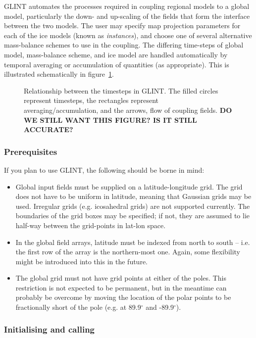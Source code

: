 GLINT automates the processes required in coupling regional models to a global
model, particularly the down- and up-scaling of the fields that form the
interface between the two models. The user may specify map projection
parameters for each of the ice models (known as \emph{instances}), and choose
one of several alternative mass-balance schemes to use in the coupling. The
differing time-steps of global model, mass-balance scheme, and ice model are
handled automatically by temporal averaging or accumulation of quantities (as
appropriate). This is illustrated schematically in figure~\ref{ug.fig.glint_timesteps}.  
%
\begin{figure}[htbp]
  \centering
  \caption{Relationship between the timesteps in GLINT. The filled circles
  represent timesteps, the rectangles represent averaging/accumulation, and the arrows,
  flow of coupling fields. \textbf{DO WE STILL WANT THIS FIGURE? IS IT STILL ACCURATE?}}
  \label{ug.fig.glint_timesteps}
\end{figure}
%
\subsubsection{Prerequisites}
%
If you plan to use GLINT, the following should be borne in mind:
%
\begin{itemize}
\item Global input fields must be supplied on a latitude-longitude
  grid. The grid does not have to be uniform in latitude, meaning that
  Gaussian grids may be used. Irregular grids (e.g. icosahedral grids) are not
  supported currently. The boundaries of the grid boxes may be specified; if
  not, they are assumed to lie half-way between the grid-points in lat-lon space.
\item In the global field arrays, latitude must be indexed from north to south
  -- i.e. the first row of the array is the northern-most one. Again, some
  flexibility might be introduced into this in the future.
\item The global grid must not have grid points at either of the
  poles. This restriction is not expected to be permanent, but in the meantime
  can probably be overcome by moving the location of the polar points to be
  fractionally short of the pole (e.g. at 89.9$^{\circ}$ and -89.9$^{\circ}$).
\end{itemize}
%
\subsubsection{Initialising and calling}

